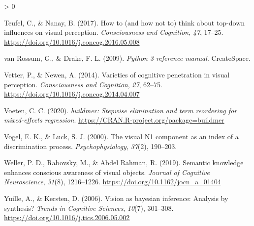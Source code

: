 \documentclass[
  english,
  man,12pt,twoside]{apa7}
\newlength{\cslhangindent}
\newenvironment{CSLReferences}[2] %
 {%
  \setlength{\parindent}{0pt}
  \ifodd #1 \everypar{\setlength{\hangindent}{\cslhangindent}}\ignorespaces\fi
  \ifnum #2 > 0
  \setlength{\parskip}{#2\baselineskip}
  \fi
 }%
 {}
\begin{document}
\begin{CSLReferences}{1}{0}
\leavevmode\hypertarget{ref-teufel2017}{}%
Teufel, C., \& Nanay, B. (2017). How to (and how not to) think about top-down influences on visual perception. \emph{Consciousness and Cognition}, \emph{47}, 17--25. \url{https://doi.org/10.1016/j.concog.2016.05.008}

\leavevmode\hypertarget{ref-vanrossum2009}{}%
van Rossum, G., \& Drake, F. L. (2009). \emph{Python 3 reference manual}. CreateSpace.

\leavevmode\hypertarget{ref-vetter2014}{}%
Vetter, P., \& Newen, A. (2014). Varieties of cognitive penetration in visual perception. \emph{Consciousness and Cognition}, \emph{27}, 62--75. \url{https://doi.org/10.1016/j.concog.2014.04.007}

\leavevmode\hypertarget{ref-R-buildmer}{}%
Voeten, C. C. (2020). \emph{{buildmer}: Stepwise elimination and term reordering for mixed-effects regression}. \url{https://CRAN.R-project.org/package=buildmer}

\leavevmode\hypertarget{ref-vogel2000}{}%
Vogel, E. K., \& Luck, S. J. (2000). The visual {N1} component as an index of a discrimination process. \emph{Psychophysiology}, \emph{37}(2), 190--203.

\leavevmode\hypertarget{ref-weller2019}{}%
Weller, P. D., Rabovsky, M., \& Abdel Rahman, R. (2019). Semantic knowledge enhances conscious awareness of visual objects. \emph{Journal of Cognitive Neuroscience}, \emph{31}(8), 1216--1226. \url{https://doi.org/10.1162/jocn_a_01404}

\leavevmode\hypertarget{ref-yuille2006}{}%
Yuille, A., \& Kersten, D. (2006). Vision as bayesian inference: Analysis by synthesis? \emph{Trends in Cognitive Sciences}, \emph{10}(7), 301--308. \url{https://doi.org/10.1016/j.tics.2006.05.002}

\end{CSLReferences}
\end{document}
